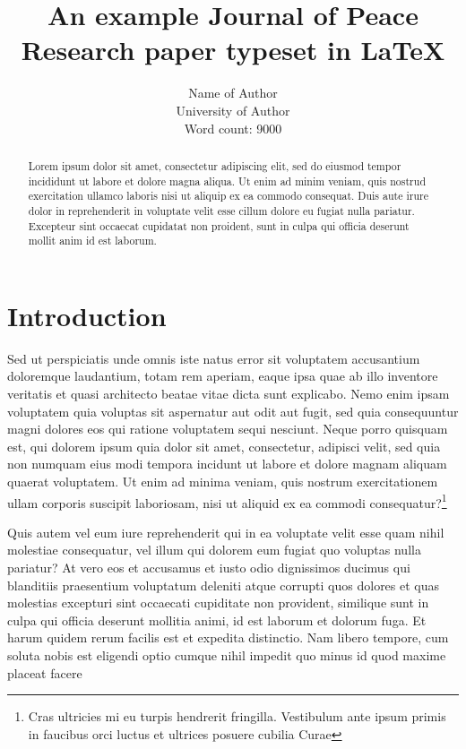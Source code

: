 \documentclass[12pt,english]{article}
\title{An example Journal of Peace Research paper typeset in \LaTeX}
\author{Name of Author \\ University of Author \\ Word count: 9000}
\begin{document}

\maketitle

\newpage


\begin{abstract}
\noindent Lorem ipsum dolor sit amet, consectetur adipiscing elit, sed do eiusmod tempor incididunt ut labore et dolore magna aliqua. Ut enim ad minim veniam, quis nostrud exercitation ullamco laboris nisi ut aliquip ex ea commodo consequat. Duis aute irure dolor in reprehenderit in voluptate velit esse cillum dolore eu fugiat nulla pariatur. Excepteur sint occaecat cupidatat non proident, sunt in culpa qui officia deserunt mollit anim id est laborum.
\end{abstract}

\newpage


\doublespacing

\section*{Introduction}

Sed ut perspiciatis unde omnis iste natus error sit voluptatem accusantium doloremque laudantium, totam rem aperiam, eaque ipsa quae ab illo inventore veritatis et quasi architecto beatae vitae dicta sunt explicabo. Nemo enim ipsam voluptatem quia voluptas sit aspernatur aut odit aut fugit, sed quia consequuntur magni dolores eos qui ratione voluptatem sequi nesciunt. Neque porro quisquam est, qui dolorem ipsum quia dolor sit amet, consectetur, adipisci velit, sed quia non numquam eius modi tempora incidunt ut labore et dolore magnam aliquam quaerat voluptatem. Ut enim ad minima veniam, quis nostrum exercitationem ullam corporis suscipit laboriosam, nisi ut aliquid ex ea commodi consequatur?\footnote{Cras ultricies mi eu turpis hendrerit fringilla. Vestibulum ante ipsum primis in faucibus orci luctus et ultrices posuere cubilia Curae} 

Quis autem vel eum iure reprehenderit qui in ea voluptate velit esse quam nihil molestiae consequatur, vel illum qui dolorem eum fugiat quo voluptas nulla pariatur? At vero eos et accusamus et iusto odio dignissimos ducimus qui blanditiis praesentium voluptatum deleniti atque corrupti quos dolores et quas molestias excepturi sint occaecati cupiditate non provident, similique sunt in culpa qui officia deserunt mollitia animi, id est laborum et dolorum fuga. Et harum quidem rerum facilis est et expedita distinctio. Nam libero tempore, cum soluta nobis est eligendi optio cumque nihil impedit quo minus id quod maxime placeat facere 
\end{document}

